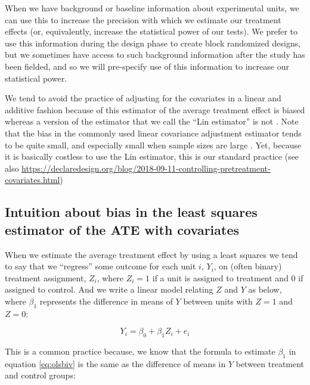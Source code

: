 \documentclass[
  12pt,
]{book}
\theoremstyle{definition}
\theoremstyle{definition}
\theoremstyle{definition}
\theoremstyle{remark}
\begin{document}
When we have background or baseline information about experimental
units, we can use this to increase the precision with which we estimate
our treatment effects (or, equivalently, increase the statistical power
of our tests). We prefer to use this information during the design phase
to create block randomized designs, but we sometimes have access to such
background information after the study has been fielded, and so we will
pre-specify use of this information to increase our statistical power.

We tend to avoid the practice of adjusting for the covariates in a
linear and additive fashion because of this estimator of the average
treatment effect is biased \citep{freedman2008rae} whereas a version of
the estimator that we call the ``Lin estimator'' is not
\citep{lin_agnostic_2013}. Note that the bias in the commonly used
linear covariance adjustment estimator tends to be quite small, and
especially small when sample sizes are large \citep{lin_agnostic_2013}.
Yet, because it is basically costless to use the Lin estimator, this is
our standard practice (see also
\url{https://declaredesign.org/blog/2018-09-11-controlling-pretreatment-covariates.html})

\hypertarget{intuition-about-bias-in-the-least-squares-estimator-of-the-ate-with-covariates}{%
\subsection{Intuition about bias in the least squares estimator of the
ATE with
covariates}\label{intuition-about-bias-in-the-least-squares-estimator-of-the-ate-with-covariates}}

When we estimate the average treatment effect by using a least squares
we tend to say that we ``regress'' some outcome for each unit \(i\),
\(Y_i\), on (often binary) treatment assignment, \(Z_i\), where
\(Z_i=1\) if a unit is assigned to treatment and 0 if assigned to
control. And we write a linear model relating \(Z\) and \(Y\) as below,
where \(\beta_1\) represents the difference in means of \(Y\) between
units with \(Z=1\) and \(Z=0\):

\begin{equation}
Y_i = \beta_0 + \beta_1 Z_i + e_i \label{eq:olsbiv}
\end{equation}

This is a common practice because, we know that the formula to estimate
\(\beta_1\) in equation \eqref{eq:olsbiv} is the same as the difference of
means in \(Y\) between treatment and control groups:
\end{document}
